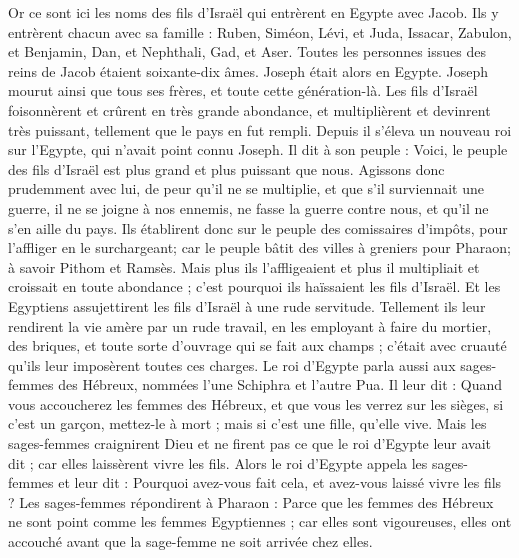 \begin{multicols}{2}
\VerseOne{}Or ce sont ici les noms des fils d'Israël qui entrèrent en Egypte avec Jacob. Ils y entrèrent chacun avec sa famille : 
Ruben, Siméon, Lévi, et Juda,
Issacar, Zabulon, et Benjamin,
Dan, et Nephthali, Gad, et Aser.
Toutes les personnes issues des reins de Jacob étaient soixante-dix âmes. Joseph était alors en Egypte.
Joseph mourut ainsi que tous ses frères, et toute cette génération-là.
Les fils d'Israël foisonnèrent et crûrent en très grande abondance, et multiplièrent et devinrent très puissant, tellement que le pays en fut rempli.
Depuis il s'éleva un nouveau roi sur l'Egypte, qui n'avait point connu Joseph.
Il dit à son peuple : Voici, le peuple des fils d'Israël est plus grand et plus puissant que nous.
Agissons donc prudemment avec lui, de peur qu'il ne se multiplie, et que s'il surviennait une guerre, il ne se joigne à nos ennemis, ne fasse la guerre contre nous, et qu'il ne s'en aille du pays.
Ils établirent donc sur le peuple des comissaires d'impôts, pour l'affliger en le surchargeant; car le peuple bâtit des villes à greniers pour  Pharaon; à savoir Pithom et Ramsès. Mais plus ils l'affligeaient et plus il  multipliait et croissait en toute abondance ; c'est pourquoi ils haïssaient les fils d'Israël.
Et les Egyptiens assujettirent les fils d’Israël à une rude servitude.
Tellement ils leur rendirent la vie amère par un rude travail, en les employant à faire du mortier, des briques, et toute sorte d'ouvrage qui se fait aux champs ; c’était avec cruauté qu’ils leur imposèrent toutes ces charges.
Le roi d'Egypte parla aussi aux sages-femmes des Hébreux, nommées l’une Schiphra et l’autre Pua.
Il leur dit : Quand vous accoucherez les femmes des Hébreux, et que vous les verrez sur les sièges, si c'est un garçon, mettez-le à mort ; mais si c'est une fille, qu'elle vive.
Mais les sages-femmes craignirent Dieu et ne firent pas ce que le roi d'Egypte leur avait dit ; car elles laissèrent vivre les fils.
Alors le roi d'Egypte appela les sages-femmes et leur dit : Pourquoi avez-vous fait cela, et avez-vous laissé vivre les fils ?
Les sages-femmes répondirent à Pharaon : Parce que les femmes des Hébreux ne sont point comme les femmes Egyptiennes ; car elles sont vigoureuses, elles ont accouché avant que la sage-femme ne soit arrivée chez elles.

\end{multicols}

